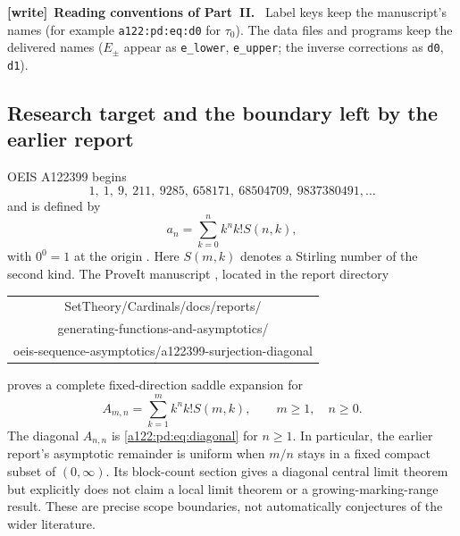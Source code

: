 \documentclass[11pt,letterpaper]{article}
\newenvironment{writenote}[1][]{\par\smallskip\begingroup\small
 \noindent\textbf{[write]}\if\relax\detokenize{#1}\relax\else~\textbf{#1.}\fi\ }%
 {\par\endgroup\smallskip}
\numberwithin{equation}{subsection}
\theoremstyle{definition}
\theoremstyle{remark}
\theoremstyle{plain}
\begin{document}
\begin{writenote}[Reading conventions of Part~II]
\smallskip
\noindent Label keys keep the manuscript's names (for example
\texttt{a122:pd:eq:d0} for $\tau_0$). The data files and programs keep
the delivered names ($E_\pm$ appear as \texttt{e\_lower}, \texttt{e\_upper};
the inverse corrections as \texttt{d0}, \texttt{d1}).
\end{writenote}

\setcounter{secnumdepth}{3}
\renewcommand{\thesubsection}{\arabic{subsection}}
\renewcommand{\theHsubsection}{pd.\arabic{subsection}}
\renewcommand{\thesubsubsection}{\thesubsection.\arabic{subsubsection}}
\setcounter{subsection}{8}

\subsection{Research target and the boundary left by the earlier report}
\label{a122:pd:sec:target}
OEIS A122399 begins
\[
1,\ 1,\ 9,\ 211,\ 9285,\ 658171,\ 68504709,\ 9837380491,\ldots
\]
and is defined by
\begin{equation}\label{a122:pd:eq:diagonal}
a_n=\sum_{k=0}^n k^n k!S(n,k),
\end{equation}
with $0^0=1$ at the origin \cite{a122:pd:oeis122399}.
Here $S(m,k)$ denotes a Stirling number of the second kind.
The ProveIt manuscript \cite{a122:pd:repo}, located in the report directory
\begin{center}\small\ttfamily
\begin{tabular}{c}
SetTheory/Cardinals/docs/reports/\\
generating-functions-and-asymptotics/\\
oeis-sequence-asymptotics/a122399-surjection-diagonal
\end{tabular}
\end{center}
proves a complete fixed-direction saddle expansion for
\begin{equation}\label{a122:pd:eq:A}
 A_{m,n}=\sum_{k=1}^{m} k^n k!S(m,k),\qquad m\ge1,\quad n\ge0.
\end{equation}
The diagonal $A_{n,n}$ is \eqref{a122:pd:eq:diagonal} for $n\ge1$.
In particular, the earlier report's asymptotic remainder is uniform when
$m/n$ stays in a fixed compact subset of $(0,\infty)$.
Its block-count section gives a diagonal central limit theorem but
explicitly does not claim a local limit theorem or a growing-marking-range
result. These are precise scope boundaries, not automatically conjectures
of the wider literature.
\end{document}
